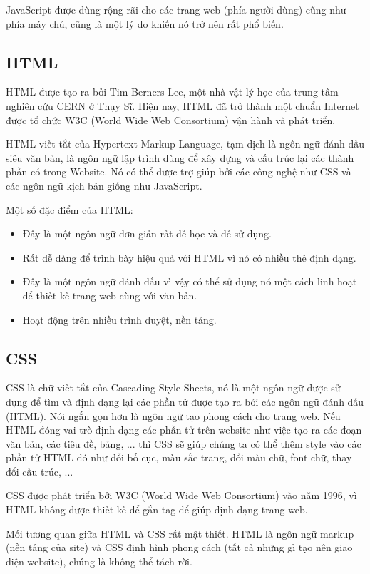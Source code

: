 JavaScript được dùng rộng rãi cho các trang web (phía người dùng) cũng như phía máy chủ, cũng là một lý do khiến nó trở nên rất phổ biến.

\subsection{HTML}
HTML được tạo ra bởi Tim Berners-Lee, một nhà vật lý học của trung tâm nghiên cứu CERN ở Thụy Sĩ. Hiện nay, HTML đã trở thành một chuẩn Internet được tổ chức W3C (World Wide Web Consortium) vận hành và phát triển.

HTML viết tắt của Hypertext Markup Language, tạm dịch là ngôn ngữ đánh dấu siêu văn bản, là ngôn ngữ lập trình dùng để xây dựng và cấu trúc lại các thành phần có trong Website. Nó có thể được trợ giúp bởi các công nghệ như CSS và các ngôn ngữ kịch bản giống như JavaScript.

Một số đặc điểm của HTML:

\begin{itemize}
    \item Đây là một ngôn ngữ đơn giản rất dễ học và dễ sử dụng.
    \item Rất dễ dàng để trình bày hiệu quả với HTML vì nó có nhiều thẻ định dạng.
    \item Đây là một ngôn ngữ đánh dấu vì vậy có thể sử dụng nó một cách linh hoạt để thiết kế trang web cùng với văn bản.
    \item Hoạt động trên nhiều trình duyệt, nền tảng.
\end{itemize}

\subsection{CSS}
CSS là chữ viết tắt của Cascading Style Sheets, nó là một ngôn ngữ được sử dụng để tìm và định dạng lại các phần tử được tạo ra bởi các ngôn ngữ đánh dấu (HTML). Nói ngắn gọn hơn là ngôn ngữ tạo phong cách cho trang web. Nếu HTML đóng vai trò định dạng các phần tử trên website như việc tạo ra các đoạn văn bản, các tiêu đề, bảng, ... thì CSS sẽ giúp chúng ta có thể thêm style vào các phần tử HTML đó như đổi bố cục, màu sắc trang, đổi màu chữ, font chữ, thay đổi cấu trúc, ...

CSS được phát triển bởi W3C (World Wide Web Consortium) vào năm 1996, vì HTML không được thiết kế để gắn tag để giúp định dạng trang web.

Mối tương quan giữa HTML và CSS rất mật thiết. HTML là ngôn ngữ markup (nền tảng của site) và CSS định hình phong cách (tất cả những gì tạo nên giao diện website), chúng là không thể tách rời.

